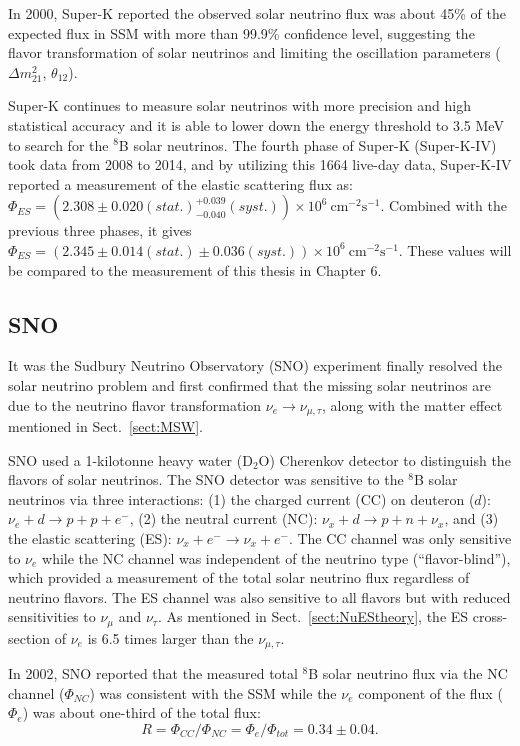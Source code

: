 In 2000, Super-K reported the observed solar neutrino flux was about 45\% of the expected flux in SSM with more than 99.9\% confidence level, suggesting the flavor transformation of solar neutrinos and limiting the oscillation parameters ($\Delta m^2_{21}$, $\theta_{12}$)\cite{superKwebsite}. 

Super-K continues to measure solar neutrinos with more precision and high statistical accuracy and it is able to lower down the energy threshold to 3.5 MeV to search for the $^8$B solar neutrinos. The fourth phase of Super-K (Super-K-IV) took data from 2008 to 2014, and by utilizing this 1664 live-day data, Super-K-IV reported a measurement of the elastic scattering flux as: $\Phi_{ES}=(2.308\pm0.020(stat.)^{+0.039}_{-0.040}(syst.))\times 10^6~\mathrm{cm^{-2}s^{-1}}$\cite{abe2016solar}. Combined with the previous three phases, it gives $\Phi_{ES}=(2.345\pm0.014(stat.)\pm 0.036(syst.))\times 10^6~\mathrm{cm^{-2}s^{-1}}$\cite{abe2016solar}. These values will be compared to the measurement of this thesis in Chapter 6.

\subsection{SNO}
It was the Sudbury Neutrino Observatory (SNO) experiment finally resolved the solar neutrino problem and first confirmed that the missing solar neutrinos are due to the neutrino flavor transformation $\nu_e\to\nu_{\mu,\tau}$, along with the matter effect mentioned in Sect.~\ref{sect:MSW}. 

SNO used a 1-kilotonne heavy water (D$_2$O) Cherenkov detector to distinguish the flavors of solar neutrinos. The SNO detector was sensitive to the $^8$B solar neutrinos via three interactions: (1) the charged current (CC) on deuteron ($d$):
$\nu_e+d\to p+p+e^-$, (2) the neutral current (NC): $\nu_x+d\to p+n+\nu_x$, and (3) the elastic scattering (ES): $\nu_x+e^-\to \nu_x+e^-$. The CC channel was only sensitive to $\nu_e$ while the NC channel was independent of the neutrino type (``flavor-blind''), which provided a measurement of the total solar neutrino flux regardless of neutrino flavors. The ES channel was also sensitive to all flavors but with reduced sensitivities to $\nu_\mu$ and $\nu_\tau$\cite{ahmad2002direct}. As mentioned in Sect.~\ref{sect:NuEStheory}, the ES cross-section of $\nu_e$ is 6.5 times larger than the $\nu_{\mu,\tau}$. 

In 2002, SNO reported that the measured total $^8$B solar neutrino flux
via the NC channel ($\Phi_{NC}$) was consistent with the SSM while the $\nu_e$
component of the flux ($\Phi_e$) was about one-third of the total flux\cite{ahmad2002direct}:
\begin{equation}
R = \Phi_{CC}/\Phi_{NC} = \Phi_e/\Phi_{tot}=0.34\pm 0.04.
\end{equation}


